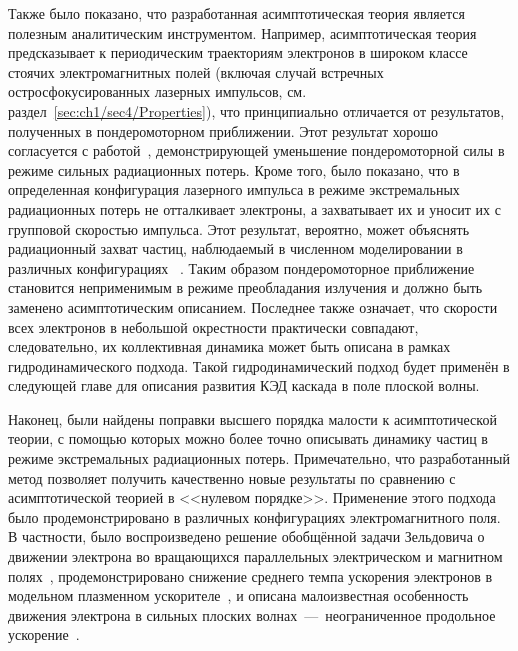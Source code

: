 Также было показано, что разработанная асимптотическая теория является полезным аналитическим инструментом.
Например, асимптотическая теория предсказывает к периодическим траекториям электронов в широком классе стоячих электромагнитных полей (включая случай встречных остросфокусированных лазерных импульсов, см. раздел~\ref{sec:ch1/sec4/Properties}), что принципиально отличается от результатов, полученных в пондеромоторном приближении.
Этот результат хорошо согласуется с работой~\cite{Fedotov14b}, демонстрирующей уменьшение пондеромоторной силы в режиме сильных радиационных потерь.
Кроме того, было показано, что в определенная конфигурация лазерного импульса в режиме экстремальных радиационных потерь не отталкивает электроны, а захватывает их и уносит их с групповой скоростью импульса.
Этот результат, вероятно, может объяснять радиационный захват частиц, наблюдаемый в численном моделировании в различных конфигурациях~\cite{Ji14b} .
Таким образом пондеромоторное приближение становится неприменимым в режиме преобладания излучения и должно быть заменено асимптотическим описанием.
Последнее также означает, что скорости всех электронов в небольшой окрестности практически совпадают, следовательно, их коллективная динамика может быть описана в рамках гидродинамического подхода.
Такой гидродинамический подход будет применён в следующей главе для описания развития КЭД каскада в поле плоской волны. 

Наконец, были найдены поправки высшего порядка малости к асимптотической теории, с помощью которых можно более точно описывать динамику частиц в режиме экстремальных радиационных потерь.
Примечательно, что разработанный метод позволяет получить качественно новые результаты по сравнению с асимптотической теорией в <<нулевом порядке>>.
Применение этого подхода было продемонстрировано в различных конфигурациях электромагнитного поля.
В частности, было воспроизведено решение обобщённой задачи Зельдовича о движении электрона во вращающихся параллельных электрическом и магнитном полях~\cite{Zeldovich75, Kostyukov2016}, продемонстрировано снижение среднего темпа ускорения электронов в модельном плазменном ускорителе~\cite{kostyukov2012radiative, golovanov2021radiation}, и описана малоизвестная особенность движения электрона в сильных плоских волнах~---~неограниченное продольное ускорение~\cite{gunn1971motion, grewing1973acceleration, thielheim1993particle,di2008exact,ekman2021exact}.

